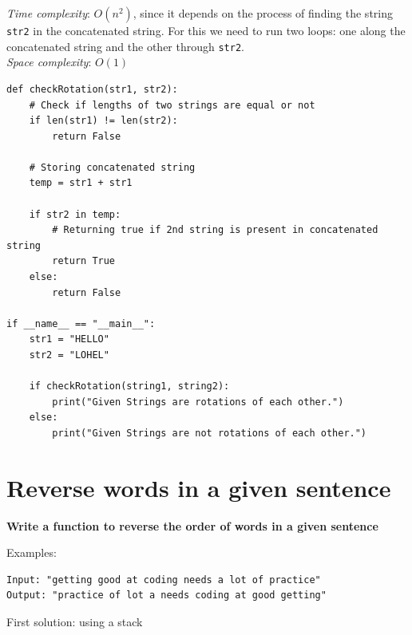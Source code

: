 \documentclass[a4paper,11pt]{book}
\begin{document}
\noindent \textit{Time complexity}: $O(n^2)$, since it depends on the process of finding the string \lstinline{str2} in the concatenated string. For this we need to run two loops: one along the concatenated string and the other through \lstinline{str2}.\\

\noindent \textit{Space complexity}: $O(1)$

\begin{lstlisting}
def checkRotation(str1, str2): 
    # Check if lengths of two strings are equal or not 
    if len(str1) != len(str2): 
        return False
  
    # Storing concatenated string 
    temp = str1 + str1 
  
    if str2 in temp:
        # Returning true if 2nd string is present in concatenated string
        return True 
    else: 
        return False
  
if __name__ == "__main__":
    str1 = "HELLO"
    str2 = "LOHEL"
      
    if checkRotation(string1, string2): 
        print("Given Strings are rotations of each other.")
    else: 
        print("Given Strings are not rotations of each other.")
\end{lstlisting}


\newpage
\section{Reverse words in a given sentence}
\textbf{Write a function to reverse the order of words in a given sentence}
\vspace{5mm}

\noindent Examples:
\begin{lstlisting}
Input: "getting good at coding needs a lot of practice"
Output: "practice of lot a needs coding at good getting"
\end{lstlisting}
\vspace{5mm}

\noindent First solution: using a stack
\vspace{5mm}
\end{document}
